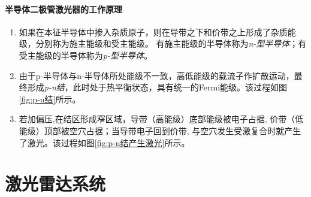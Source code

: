 \paragraph{半导体二极管激光器的工作原理}
\begin{enumerate}
	\item 如果在本征半导体中掺入杂质原子，则在导带之下和价带之上形成了杂质能级，分别称为施主能级和受主能级。
		有施主能级的半导体称为\textit{n-型半导体}；有受主能级的半导体称为\textit{p-型半导体}。
	\item 由于p-半导体与n-半导体所处能级不一致，高低能级的载流子作扩散运动，最终形成\textit{p-n结}，此时处于热平衡状态，具有统一的Fermi能级。该过程如图\ref{fig:p-n结}所示。
	\item 若加偏压,在结区形成窄区域，导带（高能级）底部能级被电子占据, 价带（低能级）顶部被空穴占据；当导带电子回到价带, 与空穴发生受激复合时就产生了激光。该过程如图\ref{fig:p-n结产生激光}所示。
\end{enumerate}
\begin{figure}[htbp]
	\centering
	\hfill
	\hfill
\end{figure}

\section{激光雷达系统} %
